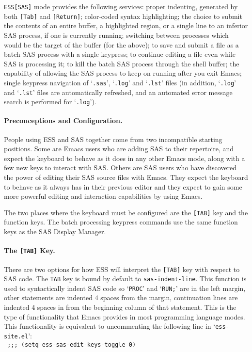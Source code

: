 \documentclass{article}
\newcommand{\stexttt}[1]{{\small\texttt{#1}}}
\newcommand{\elcode}[1]{\\{\stexttt{\hspace*{2em} #1}}\\}
\newcommand{\file}[1]{`\stexttt{#1}'}
\begin{document}
\stexttt{ESS[SAS]} mode provides the following services: proper indenting, 
generated by both
\stexttt{[Tab]} and \stexttt{[Return]}; color-coded syntax
highlighting; the choice to submit the contents of an entire buffer, a
highlighted region, or a single line to an inferior SAS process, if
one is currently running; switching between processes which
would be the target of the buffer (for the above); to save and
submit a file as a batch SAS process with a single keypress; 
to continue editing a file even while SAS is processing it; to
kill the batch SAS process through the shell buffer;
the capability of allowing the SAS process to keep on running after
you exit Emacs; single keypress navigation of \file{.sas}, \file{.log}
and \file{.lst} files (in addition, \file{.log} and \file{.lst} files are
automatically refreshed, and an automated error message search is performed
for \file{.log}).


\paragraph{Preconceptions and Configuration.}

People using ESS and SAS together come from two incompatible starting
positions.  Some are Emacs users who are adding SAS to their
repertoire, and expect the keyboard to behave as it does in any other
Emacs mode, along with a few new keys to interact with SAS.  Others
are SAS users who have discovered the power of editing their SAS
source files with Emacs.  They expect the keyboard to behave as it
always has in their previous editor and they expect to gain some more
powerful editing and interaction capabilities by using Emacs.

The two places where the keyboard must be configured are the
\texttt{[TAB]} key and the function keys.  The batch processing
keypress commands use the same function keys as the SAS Display
Manager.

\paragraph{The \texttt{[TAB]} Key.}
\label{sec:SAS:tab}

There are two options for how ESS will interpret the \stexttt{[TAB]} key
with respect to SAS code.  The \stexttt{TAB} key is bound by default to
\stexttt{sas-indent-line}.  This function is used to syntactically
indent SAS code so `\stexttt{PROC}' and `\stexttt{RUN;}' are in the left
margin, other statements are indented 4 spaces from the margin,
continuation lines are indented 4 spaces in from the beginning column of
that statement.  This is the type of functionality that Emacs provides
in most programming language modes.  This functionality is equivalent to
uncommenting the following line in \file{ess-site.el}: \elcode{;;; (setq
  ess-sas-edit-keys-toggle 0)}
\end{document}
